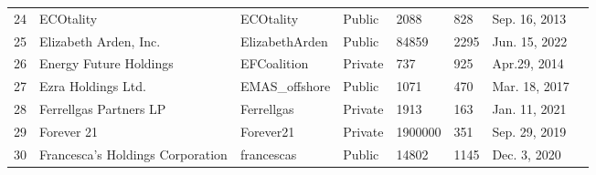 \documentclass[9pt,twoside,lineno]{pnas-new}
\begin{document}
\begin{longtable}{llllllll}
24          & ECOtality                                                                       & ECOtality                                                           & Public           & 2088               & 828                & Sep. 16, 2013                                                                                                                    \\
25          & Elizabeth Arden, Inc.                                                           & ElizabethArden                                                      & Public           & 84859              & 2295               & Jun. 15, 2022                                                                                                                         \\
26          & Energy Future Holdings                                                          & EFCoalition                                                         & Private          & 737                & 925                & Apr.29, 2014                                                                                                                        \\
27          & Ezra Holdings Ltd.                                                              & EMAS\_offshore                                                      & Public           & 1071               & 470                & Mar. 18, 2017                                                                                                                        \\
28          & Ferrellgas Partners LP                                                          & Ferrellgas                                                          & Private          & 1913               & 163                & Jan. 11, 2021                                                                                                                      \\
29          & Forever 21                                                                      & Forever21                                                           & Private          & 1900000            & 351                & Sep. 29, 2019                                                                                                                    \\
30          & Francesca's Holdings Corporation     & francescas                                                          & Public           & 14802              & 1145               & Dec. 3, 2020                                                                                                                      \\

\end{longtable}
\end{document}
